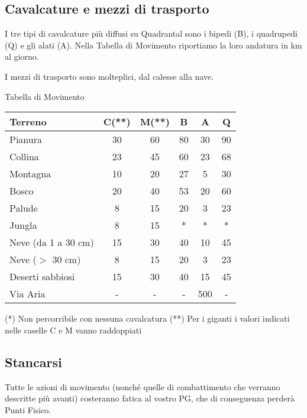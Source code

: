 {\sloppypar\raggedright \subsection{Cavalcature e mezzi di trasporto}}

I tre tipi di cavalcature pi\`u diffusi su Quadrantal sono i
bipedi (B), i quadrupedi (Q) e gli alati (A).  Nella Tabella di
Movimento riportiamo la loro andatura in km al giorno.

I mezzi di trasporto sono molteplici, dal calesse alla nave.

\begin{table*}[t]
  \begin{center}
    {\Large\sc Tabella di Movimento}\medskip
    
    \begin{tabular}{|l|c|c|c|c|c|}
      \hline
      Terreno& C(**)& M(**)& B& A& Q \\ \hline
      \hline
      Pianura&30&60&80&30&90\\ \hline
      Collina&23&45&60&23&68\\ \hline
      Montagna&10&20&27&5&30\\ \hline
      Bosco&20&40&53&20&60\\ \hline
      Palude&8&15&20&3&23\\ \hline
      Jungla&8&15&{*}&{*}&{*}\\ \hline
      Neve (da 1 a 30 cm)& 15&30&40&10&45\\ \hline 
      Neve ($>$ 30 cm)&8&15&20&3&23\\ \hline
      Deserti sabbiosi&15&30&40&15&45 \\ \hline
      Via Aria&-&-&-&500&- \\ \hline
    \end{tabular}
  \end{center}
  {\footnotesize(*) Non percorribile con nessuna cavalcatura 
  (**) Per i giganti i valori indicati
  nelle caselle C e M vanno raddoppiati}
  \caption{Tabella di Movimento}
\end{table*}

\subsection{Stancarsi}
\label{stancarsi}

Tutte le azioni di movimento (nonch\'e quelle di combattimento che
verranno descritte pi\`u avanti) costeranno fatica al vostro PG, che
di conseguenza perder\`a Punti Fisico.  

